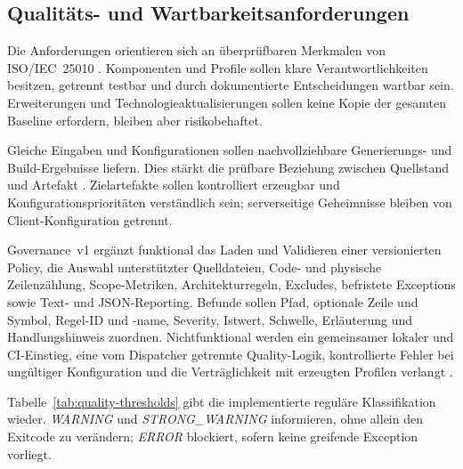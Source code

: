 \subsection{Qualitäts- und Wartbarkeitsanforderungen}
\label{subsec:qualitaets-wartbarkeitsanforderungen}

Die Anforderungen orientieren sich an überprüfbaren Merkmalen von
ISO/IEC~25010 \parencite{iso25010-2023}. Komponenten und Profile sollen klare
Verantwortlichkeiten besitzen, getrennt testbar und durch dokumentierte
Entscheidungen wartbar sein. Erweiterungen und Technologieaktualisierungen
sollen keine Kopie der gesamten Baseline erfordern, bleiben aber risikobehaftet.

Gleiche Eingaben und Konfigurationen sollen nachvollziehbare Generierungs- und
Build-Ergebnisse liefern. Dies stärkt die prüfbare Beziehung zwischen
Quellstand und Artefakt \parencite{lamb2022reproducible-builds}. Zielartefakte
sollen kontrolliert erzeugbar und Konfigurationsprioritäten verständlich sein;
serverseitige Geheimnisse bleiben von Client-Konfiguration getrennt.

Governance~v1 ergänzt funktional das Laden und Validieren einer versionierten
Policy, die Auswahl unterstützter Quelldateien, Code- und physische
Zeilenzählung, Scope-Metriken, Architekturregeln, Excludes, befristete
Exceptions sowie Text- und JSON-Reporting. Befunde sollen Pfad, optionale
Zeile und Symbol, Regel-ID und -name, Severity, Istwert, Schwelle, Erläuterung
und Handlungshinweis zuordnen. Nichtfunktional werden ein gemeinsamer lokaler
und CI-Einstieg, eine vom Dispatcher getrennte Quality-Logik, kontrollierte
Fehler bei ungültiger Konfiguration und die Verträglichkeit mit erzeugten
Profilen verlangt \parencite{kleiveist2026quality-policy}.

Tabelle~\ref{tab:quality-thresholds} gibt die implementierte reguläre
Klassifikation wieder. \emph{WARNING} und \emph{STRONG\_WARNING} informieren,
ohne allein den Exitcode zu verändern; \emph{ERROR} blockiert, sofern keine
greifende Exception vorliegt.

